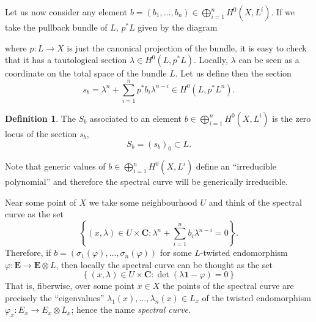 \documentclass[12pt,a4paper]{book}
\theoremstyle{definition} \newtheorem{defn}[thm]{Definition}
\theoremstyle{definition} \newtheorem{ejemplo}[thm]{Example}
\theoremstyle{remark} \newtheorem{rem}[thm]{Remark}
\def\CC{\mathbf{C}}
\def\id{\mathbf{1}}
\newcommand{\ve}[1]{\mathbf{#1}}
\let\emph\relax
\begin{document}
      Let us now consider any element $b=(b_1,\dots,b_n) \in \bigoplus_{i=1}^n H^0(X,L^i)$. If we take the pullback bundle of $L$, $p^*L$ given by the diagram
      \begin{center}
       \end{center}
       where $p:L\rightarrow X$ is just the canonical projection of the bundle, it is easy to check that it has a tautological section $\lambda \in H^0(L,p^*L)$. Locally, $\lambda$ can be seen as a coordinate on the total space of the bundle $L$. Let us define then the section
       \begin{equation*}
	 s_b=\lambda^n + \sum_{i=1}^n p^* b_i \lambda^{n-i} \in H^0(L,p^*L^n).
       \end{equation*}

       \begin{defn}
	 The \emph{spectral curve} $S_b$ associated to an element $b \in \bigoplus_{i=1}^n H^0(X,L^i)$ is the zero locus of the section $s_b$,
	 \begin{equation*}
	   S_b=(s_b)_0 \subset L.
	 \end{equation*}
       \end{defn}
       Note that generic values of $b\in \bigoplus_{i=1}^n H^0(X,L^i)$ define an ``irreducible polynomial'' and therefore the spectral curve will be generically irreducible.

       Near some point of $X$ we take some neighbourhood $U$ and think of the spectral curve as the set 
       \begin{equation*}
	 \left\{ (x,\lambda) \in U\times \CC : \lambda^n + \sum_{i=1}^n b_i \lambda^{n-i} =0 \right\}.
       \end{equation*}
       Therefore, if $b=(\sigma_1(\varphi),\dots,\sigma_n(\varphi))$ for some $L$-twisted endomorphism $\varphi: \ve{E} \rightarrow \ve{E}\otimes L$, then locally the spectral curve can be thought as the set
       \begin{equation*}
	 \left\{ (x,\lambda) \in U\times \CC: \det(\lambda \id - \varphi)=0 \right\}
       \end{equation*}
       That is, fiberwise, over some point $x \in X$ the points of the spectral curve are precisely the ``eigenvalues'' $\lambda_1(x),\dots,\lambda_n(x) \in L_x$ of the twisted endomorphism $\varphi_x:E_x \rightarrow E_x \otimes L_x$; hence the name \textit{spectral curve}.
\end{document}
